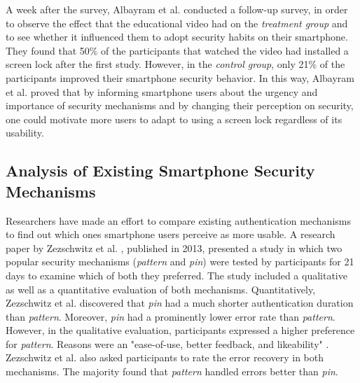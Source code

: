 A week after the survey, Albayram et al. \cite{Albayram:2017:BUL:3235924.3235929} conducted a follow-up survey, in order to observe the effect that the educational video had on the \textit{treatment group} and to see whether it influenced them to adopt security habits on their smartphone. They found that 50\% of the participants that watched the video had installed a screen lock after the first study. However, in the \textit{control group}, only 21\% of the participants improved their smartphone security behavior. In this way, Albayram et al. \cite{Albayram:2017:BUL:3235924.3235929} proved that by informing smartphone users about the urgency and importance of security mechanisms and by changing their perception on security, one could motivate more users to adapt to using a screen lock regardless of its usability. 

\subsection{Analysis of Existing Smartphone Security Mechanisms} \label{2.2.2}

Researchers have made an effort to compare existing authentication mechanisms to find out which ones smartphone users perceive as more usable. A research paper by Zezschwitz et al. \cite{PatternWild}, published in 2013, presented a study in which two popular security mechanisms (\textit{pattern} and \textit{pin}) were tested by participants for 21 days to examine which of both they preferred. The study included a qualitative as well as a quantitative evaluation of both mechanisms. Quantitatively, Zezschwitz et al. \cite{PatternWild} discovered that \textit{pin} had a much shorter authentication duration than \textit{pattern}. Moreover, \textit{pin} had a prominently lower error rate than \textit{pattern}. However, in the qualitative evaluation, participants expressed a higher preference for \textit{pattern}. Reasons were an "ease-of-use, better feedback, and likeability" \cite{PatternWild}. Zezschwitz et al. \cite{PatternWild} also asked participants to rate the error recovery in both mechanisms. The majority found that \textit{pattern} handled errors better than \textit{pin}.\\

